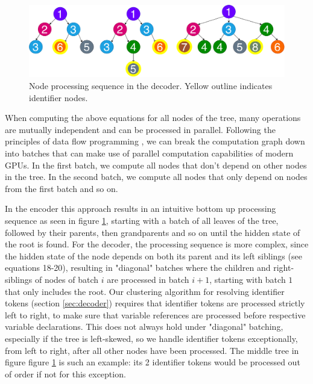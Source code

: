 \begin{figure}
    \centering
    \includegraphics[width=\linewidth]{images/TreeBatchingIdentifiers.pdf}
    \caption{Node processing sequence in the decoder. Yellow outline indicates identifier nodes.}
    \label{fig:treeBatchingDecoder}
\end{figure}

When computing the above equations for all nodes of the tree, many operations are mutually independent and can be processed in parallel.
Following the principles of data flow programming \cite{schwarzkopfRemarkableUtilityDataflow2020}, we can break the computation graph down into batches that can make use of parallel computation capabilities of modern GPUs.
In the first batch, we compute all nodes that don't depend on other nodes in the tree.
In the second batch, we compute all nodes that only depend on nodes from the first batch and so on.

In the encoder this approach results in an intuitive bottom up processing sequence as seen in figure \ref{fig:treeBatchingDecoder}, starting with a batch of all leaves of the tree, followed by their parents, then grandparents and so on until the hidden state of the root is found.
For the decoder, the processing sequence is more complex, since the hidden state of the node depends on both its parent and its left siblings (see equations 18-20), resulting in "diagonal" batches where the children and right-siblings of nodes of batch $i$ are processed in batch $i+1$, starting with batch $1$ that only includes the root.
Our clustering algorithm for resolving identifier tokens (section \ref{sec:decoder}) requires that identifier tokens are processed strictly left to right, to make sure that variable references are processed before respective variable declarations.
This does not always hold under "diagonal" batching, especially if the tree is left-skewed, so we handle identifier tokens exceptionally, from left to right, after all other nodes have been processed.
The middle tree in figure figure \ref{fig:treeBatchingDecoder} is such an example: its 2 identifier tokens would be processed out of order if not for this exception.

